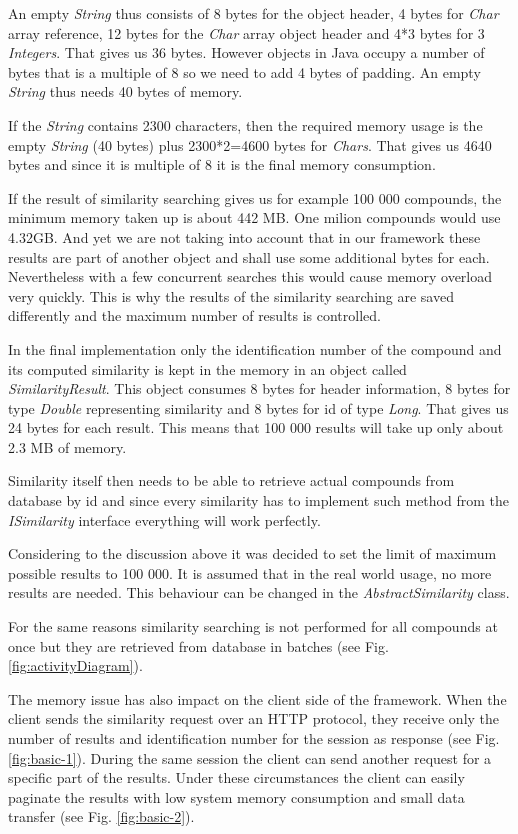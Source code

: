 \documentclass[thesis=M,english]{FITthesis}[2012/10/20]
\begin{document}
An empty \textit{String} thus consists of 8 bytes for the object header, 4 bytes for \textit{Char} array reference, 12 bytes for the \textit{Char} array object header and 4*3 bytes for 3 \textit{Integers}. That gives us 36 bytes. However objects in Java occupy a number of bytes that is a multiple of 8 so we need to add 4 bytes of padding. An empty \textit{String} thus needs 40 bytes of memory.

If the \textit{String} contains 2300 characters, then the required memory usage is the empty \textit{String} (40 bytes) plus 2300*2=4600 bytes for \textit{Chars}. That gives us 4640 bytes and since it is multiple of 8 it is the final memory consumption.

If the result of similarity searching gives us for example 100 000 compounds, the minimum memory taken up is about 442 MB. One milion compounds would use 4.32GB. And yet we are not taking into account that in our framework these results are part of another object and shall use some additional bytes for each. Nevertheless with a few concurrent searches this would cause memory overload very quickly. This is why the results of the similarity searching are saved differently and the maximum number of results is controlled.

In the final implementation only the identification number of the compound and its computed similarity is kept in the memory in an object called \textit{SimilarityResult}. This object consumes 8 bytes for header information, 8 bytes for type \textit{Double} representing similarity and 8 bytes for id of type \textit{Long}. That gives us 24 bytes for each result. This means that 100 000 results will take up only about 2.3 MB of memory.

Similarity itself then needs to be able to retrieve actual compounds from database by id and since every similarity has to implement such method from the \textit{ISimilarity} interface everything will work perfectly.

Considering to the discussion above it was decided to set the limit of maximum possible results to 100 000. It is assumed that in the real world usage, no more results are needed. This behaviour can be changed in the \textit{AbstractSimilarity} class.

For the same reasons similarity searching is not performed for all compounds at once but they are retrieved from database in batches (see Fig. \ref{fig:activityDiagram}).

The memory issue has also impact on the client side of the framework. When the client sends the similarity request over an HTTP protocol, they receive only the number of results and identification number for the session as response (see Fig. \ref{fig:basic-1}). During the same session the client can send another request for a specific part of the results. Under these circumstances the client can easily paginate the results with low system memory consumption and small data transfer (see Fig. \ref{fig:basic-2}).
\end{document}
